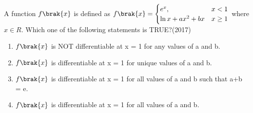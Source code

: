     \item A function $f\brak{x}$ is defined as $f\brak{x} = \begin{cases}e^x, & x<1\\ \ln x+ax^2+bx &x\geq 1\end{cases}$ where $x \in R$. Which one of the following statements is TRUE?\hfill (2017)
    \begin{enumerate}[label = (\Alph*)]
        \item $f\brak{x}$ is NOT differentiable at x = 1 for any values of a and b.
        \item $f\brak{x}$ is differentiable at x = 1 for unique values of a and b.
        \item $f\brak{x}$ is differentiable at x = 1 for all values of a and b such that a+b = e.
        \item $f\brak{x}$ is differentiable at x = 1 for all values of a and b.
    \end{enumerate}

